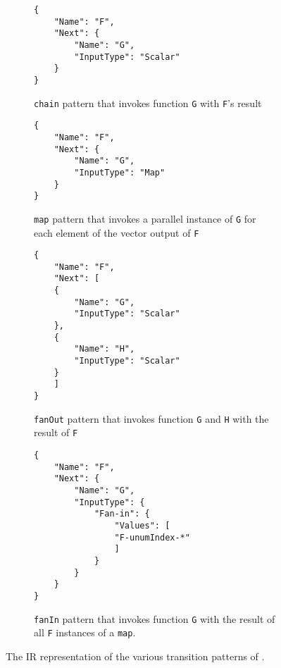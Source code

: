 \begin{figure*}[t!]
	\centering
	\begin{subfigure}[t]{\columnwidth}
		\centering
		\begin{verbatim}
{
	"Name": "F",
	"Next": {
		"Name": "G",
		"InputType": "Scalar"
	}
}
		\end{verbatim}
		\caption{\texttt{chain} pattern that invokes function \texttt{G} with
			\texttt{F}'s result}
		\label{fig:gadget-examples-chain}
	\end{subfigure}
	\begin{subfigure}[t]{\columnwidth}
		\centering
		\begin{verbatim}
{
	"Name": "F",
	"Next": {
		"Name": "G",
		"InputType": "Map"
	}
}
		\end{verbatim}
		\caption{\texttt{map} pattern that invokes a parallel instance of
			\texttt{G} for each element of the vector output of \texttt{F}}
		\label{fig:gadget-examples-map}
	\end{subfigure}
	\hfill
	\begin{subfigure}[t]{\columnwidth}
		\centering
		\begin{verbatim}
{
	"Name": "F",
	"Next": [
	{
		"Name": "G",
		"InputType": "Scalar"
	},
	{
		"Name": "H",
		"InputType": "Scalar"
	}
	]
}
		\end{verbatim}
		\caption{\texttt{fanOut} pattern that invokes function \texttt{G} and
			\texttt{H} with the result of \texttt{F}}
		\label{fig:gadget-examples-fanout}
	\end{subfigure}
	\begin{subfigure}[t]{\columnwidth}
		\centering
		\begin{verbatim}
{
	"Name": "F",
	"Next": {
		"Name": "G",
		"InputType": {
			"Fan-in": {
				"Values": [
				"F-unumIndex-*"
				]
			}
		}
	}
}
		\end{verbatim}
		\caption{\texttt{fanIn} pattern that invokes function \texttt{G} with
			the result of all \texttt{F} instances of a \texttt{map}.}
		\label{fig:gadget-examples-fanin}
	\end{subfigure}
	\caption{The IR representation of the various transition patterns of \name{} . }
	\label{fig:arch2}
\end{figure*}

